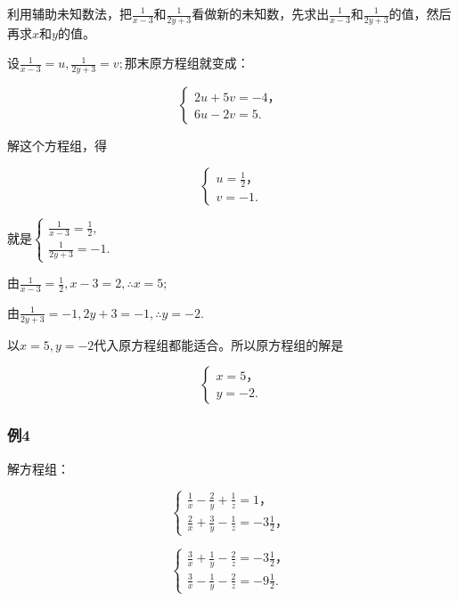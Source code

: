 利用辅助未知数法，把\(\frac{1}{x - 3}\)和\(\frac{1}{2y + 3}\)看做新的未知数，先求出\(\frac{1}{x - 3}\)和\(\frac{1}{2y + 3}\)的值，然后再求\(x\)和\(y\)的值。

设\(\frac{1}{x - 3} = u, \frac{1}{2y + 3} = v;\)那末原方程组就变成：

\[
\left\{ \begin{array}{l} 2 u + 5 v = - 4\text{，} \\ 6 u - 2 v = 5. \end{array} \right. \tag{3}
\]

解这个方程组，得

\[
\left\{ \begin{array}{l} u = \frac{1}{2}\text{，} \\ v = - 1. \end{array} \right.
\]

就是\(\left\{ \begin{array}{l} \frac{1}{x - 3} = \frac{1}{2}, \\ \frac{1}{2y + 3} = -1. \end{array} \right.\)

由\(\frac{1}{x - 3} = \frac{1}{2}, x - 3 = 2, \therefore x = 5;\)

由\(\frac{1}{2y + 3} = -1, 2y + 3 = -1, \therefore y = -2.\)

以\(x = 5, y = -2\)代入原方程组都能适合。所以原方程组的解是

\[
\left\{ \begin{array}{l} x = 5\text{，} \\ y = - 2. \end{array} \right.
\]

\subsubsection{例4}

解方程组：

\[
\left\{ \begin{array}{l} \frac{1}{x} - \frac{2}{y} + \frac{1}{z} = 1\text{，} \\ \frac{2}{x} + \frac{3}{y} - \frac{1}{z} = - 3 \frac{1}{2}\text{，} \end{array} \right. \tag{1}
\]

\[
\left\{ \begin{array}{l} \frac{3}{x} + \frac{1}{y} - \frac{2}{z} = - 3 \frac{1}{2}\text{，} \\ \frac{3}{x} - \frac{1}{y} - \frac{2}{z} = - 9 \frac{1}{2}. \end{array} \right. \tag{2}
\]

